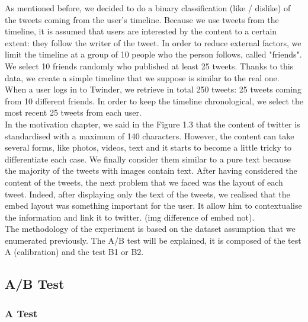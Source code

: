 As mentioned before, we decided to do a binary classification (like / dislike) of the tweets coming from the 
user's timeline. Because we use tweets from the timeline, it is assumed that users are interested by the 
content to a certain extent: they follow the writer of the tweet. In order to reduce external factors, we limit the 
timeline at a group of 10 people who the person follows, called "friends". We select 10 friends randomly who 
published at least 25 tweets. Thanks to this data, we create a simple timeline that we suppose is similar to the 
real one. When a user logs in to Twinder, we retrieve in total 250 tweets: 25 tweets coming from 10 different 
friends. In order to keep the timeline chronological, we select the most recent 25 tweets from each user. \\
In the motivation chapter, we said in the Figure 1.3 that the content of twitter is standardised with a maximum of 140 characters. However, the content can take several forms, like photos, videos, text and it starts to become a little tricky to differentiate each case. We finally consider them similar to a pure text because the majority of the tweets with images contain text. After having considered the content of the tweets, the next problem that we faced was the layout of each tweet. Indeed, after displaying only the text of the tweets, we realised that the embed layout was something important for the user. It allow him to contextualise the information and link it to twitter. (img difference of embed not). \\
The methodology of the experiment is based on the dataset assumption that we enumerated previously. The 
A/B test will be explained, it is composed of the test A (calibration) and the test B1 or B2.  

\subsection{A/B Test}

\subsubsection{A Test}






